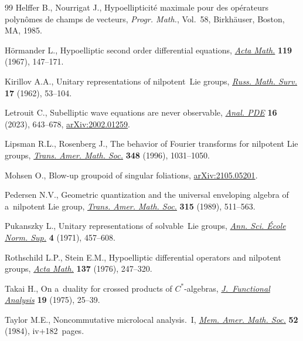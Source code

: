 \documentclass[pdftex]{sigma}
\numberwithin{equation}{section}
\theoremstyle{definition}
\begin{document}
\begin{thebibliography}{99}
Helffer B., Nourrigat J., Hypoellipticit\'e maximale pour des op\'erateurs
 polyn\^omes de champs de vecteurs, \textit{Progr. Math.}, Vol.~58,
 Birkh\"auser, Boston, MA, 1985.

H\"ormander L., Hypoelliptic second order differential equations,
 \href{https://doi.org/10.1007/BF02392081}{\textit{Acta Math.}} \textbf{119}
 (1967), 147--171.

Kirillov A.A., Unitary representations of nilpotent~{L}ie groups,
 \href{https://doi.org/10.1070/RM1962v017n04ABEH004118}{\textit{Russ. Math.
 Surv.}} \textbf{17} (1962), 53--104.

Letrouit C., Subelliptic wave equations are never observable,
 \href{https://doi.org/10.2140/apde.2023.16.643}{\textit{Anal. PDE}}
 \textbf{16} (2023), 643--678,
 \href{https://arxiv.org/abs/2002.01259}{arXiv:2002.01259}.

Lipsman R.L., Rosenberg J., The behavior of {F}ourier transforms for nilpotent
 {L}ie groups,
 \href{https://doi.org/10.1090/S0002-9947-96-01583-8}{\textit{Trans. Amer.
 Math. Soc.}} \textbf{348} (1996), 1031--1050.

Mohsen O., Blow-up groupoid of singular foliations,
 \href{https://arxiv.org/abs/2105.05201}{arXiv:2105.05201}.

Pedersen N.V., Geometric quantization and the universal enveloping algebra of a~nilpotent {L}ie group, \href{https://doi.org/10.2307/2001294}{\textit{Trans.
 Amer. Math. Soc.}} \textbf{315} (1989), 511--563.

Pukanszky L., Unitary representations of solvable~{L}ie groups,
 \href{https://doi.org/10.24033/asens.1218}{\textit{Ann. Sci. \'Ecole Norm.
 Sup.}} \textbf{4} (1971), 457--608.

Rothschild L.P., Stein E.M., Hypoelliptic differential operators and nilpotent
 groups, \href{https://doi.org/10.1007/BF02392419}{\textit{Acta Math.}}
 \textbf{137} (1976), 247--320.

Takai H., On a~duality for crossed products of {$C^{\ast} $}-algebras,
 \href{https://doi.org/10.1016/0022-1236(75)90004-x}{\textit{J.~Functional
 Analysis}} \textbf{19} (1975), 25--39.

Taylor M.E., Noncommutative microlocal analysis.~{I},
 \href{https://doi.org/10.1090/memo/0313}{\textit{Mem. Amer. Math. Soc.}}
 \textbf{52} (1984), iv+182~pages.

\end{thebibliography}\LastPageEnding
\end{document}
